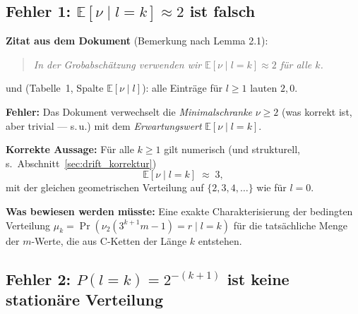 \documentclass[12pt,a4paper]{article}
\newcommand{\vii}{\nu_2}
\newcommand{\E}{\mathbb{E}}
\begin{document}
\subsection{Fehler 1: \texorpdfstring{$\E[\nu \mid l{=}k] \approx 2$}{E[nu|l=k] ≈ 2} ist falsch}

\begin{tcolorbox}[korrektur, title={Fehler 1 --- Falsche Erwartungswert-Schätzung}]
\textbf{Zitat aus dem Dokument} (Bemerkung nach Lemma 2.1):
\begin{quote}
\itshape
In der Grobabschätzung verwenden wir $\E[\nu \mid l{=}k] \approx 2$ für alle $k$.
\end{quote}
und (Tabelle~1, Spalte $\E[\nu \mid l]$):
alle Einträge für $l \geq 1$ lauten $2{,}0$.

\medskip
\textbf{Fehler:} Das Dokument verwechselt die \emph{Minimalschranke}
$\nu \geq 2$ (was korrekt ist, aber trivial --- s.\,u.) mit dem
\emph{Erwartungswert} $\E[\nu \mid l{=}k]$.

\medskip
\textbf{Korrekte Aussage:} Für alle $k \geq 1$ gilt numerisch
(und strukturell, s.\ Abschnitt~\ref{sec:drift_korrektur})
\[
  \E[\nu \mid l{=}k] \;\approx\; 3,
\]
mit der gleichen geometrischen Verteilung auf $\{2, 3, 4, \ldots\}$
wie für $l = 0$.

\medskip
\textbf{Was bewiesen werden müsste:}
Eine exakte Charakterisierung der bedingten Verteilung
$\mu_k = \Pr(\vii(3^{k+1}m - 1) = r \mid l{=}k)$ für die
tatsächliche Menge der $m$-Werte, die aus C-Ketten der Länge $k$ entstehen.
\end{tcolorbox}

\subsection{Fehler 2: \texorpdfstring{$P(l{=}k) = 2^{-(k+1)}$}{P(l=k) = 2^{-(k+1)}} ist keine stationäre Verteilung}
\end{document}
